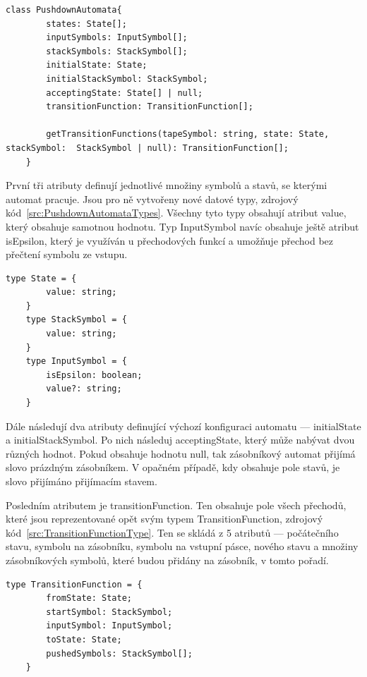 \begin{lstlisting}[label=src:PushdownAutomataDefinition, caption={Deklarce třídy PushdownAutomata}]
    class PushdownAutomata{
        states: State[];
        inputSymbols: InputSymbol[];
        stackSymbols: StackSymbol[];
        initialState: State;
        initialStackSymbol: StackSymbol;
        acceptingState: State[] | null;
        transitionFunction: TransitionFunction[];

        getTransitionFunctions(tapeSymbol: string, state: State, stackSymbol:  StackSymbol | null): TransitionFunction[];
    }
\end{lstlisting}

První tři atributy definují jednotlivé množiny symbolů a stavů, se kterými automat pracuje. Jsou pro ně vytvořeny nové datové typy, zdrojový kód~\ref{src:PushdownAutomataTypes}. Všechny tyto typy obsahují atribut value, který obsahuje samotnou hodnotu. Typ InputSymbol navíc obsahuje ještě atribut isEpsilon, který je využíván u přechodových funkcí a umožňuje přechod bez přečtení symbolu ze vstupu.

\begin{lstlisting}[label=src:PushdownAutomataTypes, caption={Datové typy State, StackSymbol, InputSymbol}]
    type State = {
        value: string;
    }
    type StackSymbol = {
        value: string;
    }
    type InputSymbol = {
        isEpsilon: boolean;
        value?: string;
    }
\end{lstlisting}

Dále následují dva atributy definující výchozí konfiguraci automatu --- initialState a initialStackSymbol. Po nich následuj acceptingState, který může nabývat dvou různých hodnot. Pokud obsahuje hodnotu null, tak zásobníkový automat přijímá slovo prázdným zásobníkem. V opačném případě, kdy obsahuje pole stavů, je slovo přijímáno přijímacím stavem.

Posledním atributem je transitionFunction. Ten obsahuje pole všech přechodů, které jsou reprezentované opět svým typem TransitionFunction, zdrojový kód~\ref{src:TransitionFunctionType}. Ten se skládá z 5 atributů --- počátečního stavu, symbolu na zásobníku, symbolu na vstupní pásce, nového stavu a množiny zásobníkových symbolů, které budou přidány na zásobník, v tomto pořadí.

\begin{lstlisting}[label=src:PushdownAutomataTransitionFunction, caption={Datový typ TransitionFunction}]
    type TransitionFunction = {
        fromState: State;
        startSymbol: StackSymbol;
        inputSymbol: InputSymbol;
        toState: State;
        pushedSymbols: StackSymbol[];
    }
\end{lstlisting}

